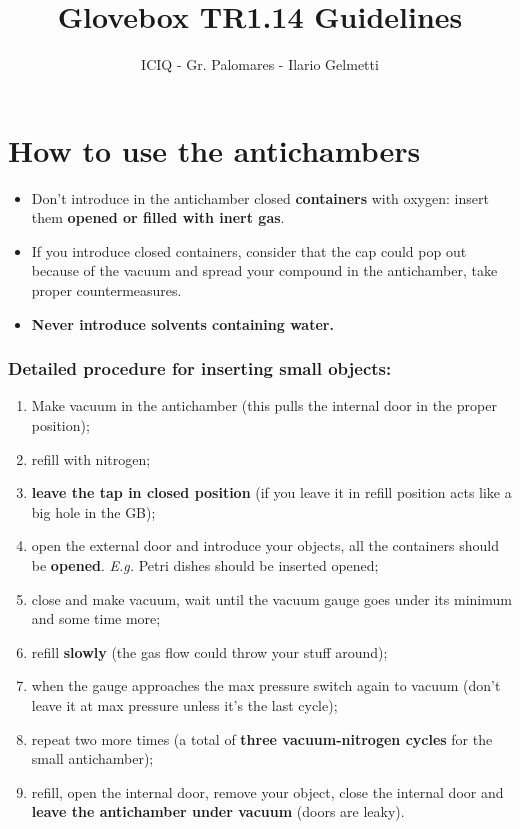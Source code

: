 \documentclass[a4paper,15pt]{scrartcl}
\title{Glovebox TR1.14 Guidelines}
\subtitle{}
\author{ICIQ - Gr. Palomares - Ilario Gelmetti}
\date{}
\begin{document}
\maketitle

\section*{How to use the antichambers}
\begin{itemize}
	\item     Don't introduce in the antichamber closed \textbf{containers} with oxygen: insert them \textbf{opened or filled with inert gas}.
	\item     If you introduce closed containers, consider that the cap could pop out because of the vacuum and spread your compound in the antichamber, take proper countermeasures.
	\item     \textbf{Never introduce solvents containing water.}
\end{itemize}
\subsubsection*{Detailed procedure for inserting small objects:}
\begin{enumerate}
	\item     Make vacuum in the antichamber (this pulls the internal door in the proper position);
	\item     refill with nitrogen;
	\item     \textbf{leave the tap in closed position} (if you leave it in refill position acts like a big hole in the GB);
	\item     open the external door and introduce your objects, all the containers should be \textbf{opened}. \textit{E.g.} Petri dishes should be inserted opened;
	\item     close and make vacuum, wait until the vacuum gauge goes under its minimum and some time more;
	\item     refill \textbf{slowly} (the gas flow could throw your stuff around);
	\item     when the gauge approaches the max pressure switch again to vacuum (don't leave it at max pressure unless it's the last cycle);
	\item     repeat two more times (a total of \textbf{three vacuum-nitrogen cycles} for the small antichamber);
	\item     refill, open the internal door, remove your object, close the internal door and \textbf{leave the antichamber under vacuum} (doors are leaky).
\end{enumerate}
\end{document}
